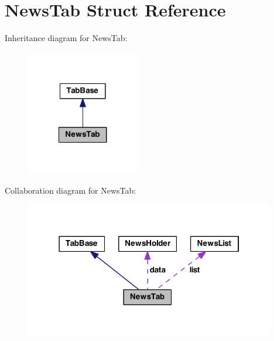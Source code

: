 \hypertarget{struct_news_tab}{\section{News\-Tab Struct Reference}
\label{struct_news_tab}
}


Inheritance diagram for News\-Tab\-:
\nopagebreak
\begin{figure}[H]
\begin{center}
\leavevmode
\includegraphics[width=140pt]{struct_news_tab__inherit__graph}
\end{center}
\end{figure}


Collaboration diagram for News\-Tab\-:
\nopagebreak
\begin{figure}[H]
\begin{center}
\leavevmode
\includegraphics[width=309pt]{struct_news_tab__coll__graph}
\end{center}
\end{figure}
